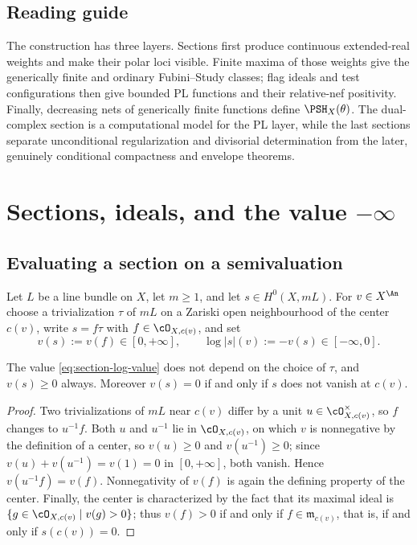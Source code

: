 \subsection{Reading guide}
\label{sec:ch34-roadmap}

The construction has three layers.  Sections first produce continuous
extended-real weights and make their polar loci visible.  Finite maxima of
those weights give the generically finite and ordinary Fubini--Study
classes; flag ideals and test configurations then give bounded PL
functions and their relative-nef positivity.  Finally, decreasing nets of
generically finite functions define $\PSH_X(\theta)$.  The dual-complex
section is a computational model for the PL layer, while the last sections
separate unconditional regularization and divisorial determination from
the later, genuinely conditional compactness and envelope theorems.

\section{Sections, ideals, and the value \texorpdfstring{$-\infty$}{-infinity}}
\label{sec:ch34-sections}

\subsection{Evaluating a section on a semivaluation}

Let $L$ be a line bundle on $X$, let $m\ge1$, and let
$s\in H^0(X,mL)$.  For $v\in X^{\An}$ choose a trivialization
$\tau$ of $mL$ on a Zariski open neighbourhood of the center $c(v)$,
write $s=f\tau$ with $f\in\cO_{X,c(v)}$, and set
\begin{equation}
\label{eq:section-log-value}
 v(s):=v(f)\in[0,+\infty],
 \qquad
 \log|s|(v):=-v(s)\in[-\infty,0].
\end{equation}

\begin{lemma}
\label{lem:ch34-frame-independence}
The value \eqref{eq:section-log-value} does not depend on the choice of
$\tau$, and $v(s)\ge0$ always.  Moreover $v(s)=0$ if and only if
$s$ does not vanish at $c(v)$.
\end{lemma}

\begin{proof}
Two trivializations of $mL$ near $c(v)$ differ by a unit
$u\in\cO_{X,c(v)}^\times$, so $f$ changes to $u^{-1}f$.  Both $u$
and $u^{-1}$ lie in $\cO_{X,c(v)}$, on which $v$ is nonnegative by the
definition of a center, so $v(u)\ge0$ and $v(u^{-1})\ge0$; since
$v(u)+v(u^{-1})=v(1)=0$ in $[0,+\infty]$, both vanish.  Hence
$v(u^{-1}f)=v(f)$.  Nonnegativity of $v(f)$ is again the defining
property of the center.  Finally, the center is characterized by the fact
that its maximal ideal is $\{g\in\cO_{X,c(v)}\mid v(g)>0\}$; thus
$v(f)>0$ if and only if $f\in\mathfrak m_{c(v)}$, that is, if and only
if $s(c(v))=0$.
\end{proof}

